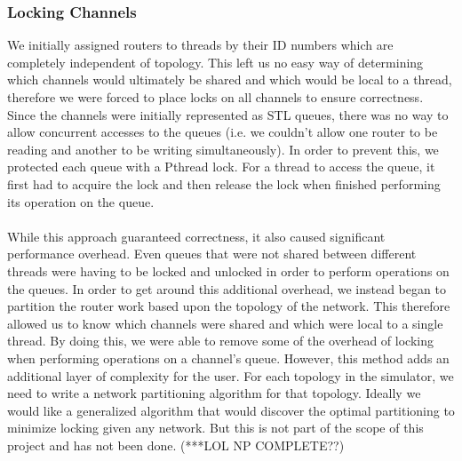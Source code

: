 \documentclass{article}
\begin{document}
\begin{multicols}{2}
\subsubsection{Locking Channels}
We initially assigned routers to threads by their ID numbers which are completely independent of
topology.  This left us no easy way of determining which channels would
ultimately be shared and which would be local to a thread, therefore we
were forced to place locks on all channels to ensure correctness.  Since
the channels were initially represented as STL queues, there was no way to
allow concurrent accesses to the queues (i.e. we couldn't allow one router
to be reading and another to be writing simultaneously).  In order to
prevent this, we protected each queue with a Pthread lock.  For a thread
to access the queue, it first had to acquire the lock and then release the
lock when finished performing its operation on the queue.\\
~\\
While this approach guaranteed correctness, it also caused significant
performance overhead.  Even queues that were not shared between different
threads were having to be locked and unlocked in order to perform
operations on the queues.  In order to get around this additional
overhead, we instead began to partition the router work based upon the
topology of the network.  This therefore allowed us to know which channels
were shared and which were local to a single thread.  By doing this, we
were able to remove some of the overhead of locking when performing
operations on a channel's queue. However, this method adds an additional layer of complexity for the user. For each topology in the simulator, we need to write a network partitioning algorithm for that topology. Ideally we would like a generalized algorithm that would discover the optimal partitioning to minimize locking given any network. But this is not part of the scope of this project and has not been done. (***LOL NP COMPLETE??)


\end{multicols}
\end{document}
